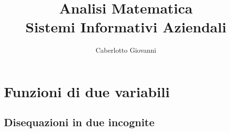 \documentclass{report}
\title{\Huge{Analisi Matematica}\\ Sistemi Informativi Aziendali}
\author{\huge{Caberlotto Giovanni}}
\date{}
\begin{document}
\maketitle
\newpage%
\tableofcontents
\pagebreak

\chapter{Funzioni di due variabili} %
\label{chap:Funzioni di due variabili}

\section{Disequazioni in due incognite} %
\label{sec:Disequazioni in due incognite}
\end{document}
